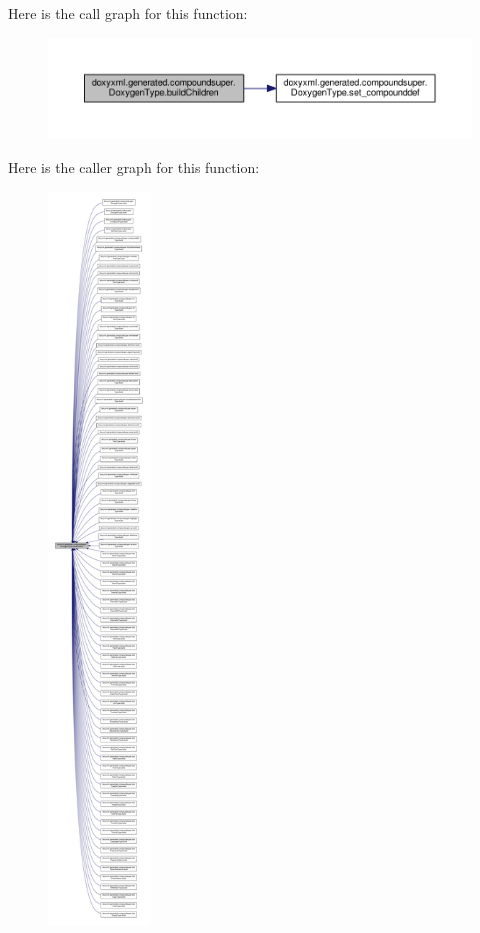 Here is the call graph for this function\+:
\nopagebreak
\begin{figure}[H]
\begin{center}
\leavevmode
\includegraphics[width=350pt]{d0/d54/classdoxyxml_1_1generated_1_1compoundsuper_1_1DoxygenType_afb457bbf3ab19c6595b325aa8ae2357b_cgraph}
\end{center}
\end{figure}




Here is the caller graph for this function\+:
\nopagebreak
\begin{figure}[H]
\begin{center}
\leavevmode
\includegraphics[height=550pt]{d0/d54/classdoxyxml_1_1generated_1_1compoundsuper_1_1DoxygenType_afb457bbf3ab19c6595b325aa8ae2357b_icgraph}
\end{center}
\end{figure}


